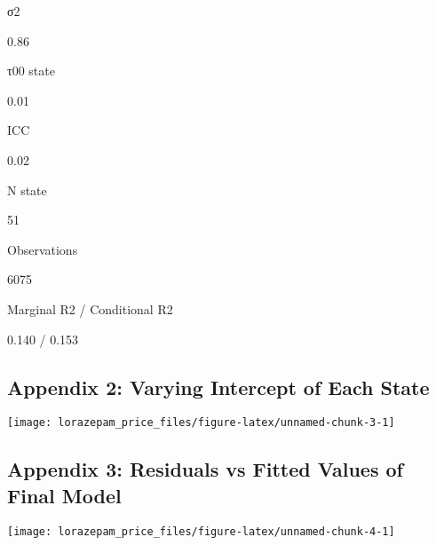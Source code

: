 \documentclass[
]{article}
\begin{document}
σ2

0.86

τ00 state

0.01

ICC

0.02

N state

51

Observations

6075

Marginal R2 / Conditional R2

0.140 / 0.153

\newpage

\hypertarget{appendix-2-varying-intercept-of-each-state}{%
\subsection{Appendix 2: Varying Intercept of Each
State}\label{appendix-2-varying-intercept-of-each-state}}

\begin{center}\texttt{[image: lorazepam\_price\_files/figure-latex/unnamed-chunk-3-1]} \end{center}

\newpage

\hypertarget{appendix-3-residuals-vs-fitted-values-of-final-model}{%
\subsection{Appendix 3: Residuals vs Fitted Values of Final
Model}\label{appendix-3-residuals-vs-fitted-values-of-final-model}}

\begin{center}\texttt{[image: lorazepam\_price\_files/figure-latex/unnamed-chunk-4-1]} \end{center}
\end{document}
